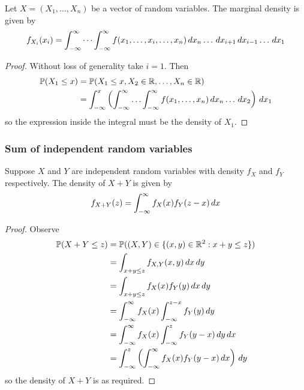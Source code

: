 \documentclass{../../template/note}
\begin{document}
    \begin{proposition}
        Let \(X = (X_1, \dots, X_n)\) be a vector of random variables. The marginal density is given by
        \begin{align*}
            f_{X_i}(x_i) = \int_{-\infty}^\infty \cdots \int_{-\infty}^\infty f(x_1, \dots, x_i, \dots, x_n) \,d{x}_n \dots \,d{x}_{i+1} \,d{x}_{i-1} \dots \,d{x}_1
        \end{align*}
    \end{proposition}

    \begin{proof}
        Without loss of generality take \(i=1\). Then
        \begin{align*}
            \mathbb P(X_1 \leq x) &= \mathbb P(X_1 \leq x, X_2 \in \mathbb R, \dots, X_n \in \mathbb R) \\
            &= \int_{-\infty}^x \left(\int_{-\infty}^\infty \dots \int_{-\infty}^\infty f(x_1, \dots, x_n) \,d{x}_n \dots \,d{x}_2 \right)\,d{x}_1
        \end{align*}
        so the expression inside the integral must be the density of \(X_1\).
    \end{proof}
    
    \subsubsection{Sum of independent random variables}


    \begin{proposition}
        Suppose \(X\) and \(Y\) are independent random variables with density \(f_X\) and \(f_Y\) respectively. The density of \(X+Y\) is given by
        \begin{align*}
            f_{X+Y}(z) = \int_{-\infty}^\infty f_X(x)f_Y(z-x) \,d{x}
        \end{align*}
    \end{proposition}
    
    \begin{proof}
        Observe
        \begin{align*}
            \mathbb P(X+Y \leq z) &= \mathbb P((X, Y) \in \{(x, y) \in \mathbb R^2: x+y \leq z\}) \\
            &= \int_{x+y \leq z} f_{X,Y}(x, y) \,d{x} \,d{y} \\
            &= \int_{x+y \leq z} f_X(x) f_Y(y) \,d{x} \,d{y} \\
            &= \int_{-\infty}^\infty f_X(x) \int_{-\infty}^{z-x} f_Y(y) \,d{y} \\
            &= \int_{-\infty}^\infty f_X(x) \int_{-\infty}^z f_Y(y-x) \,d{y} \,d{x} \\
            &= \int_{-\infty}^z \left(\int_{-\infty}^\infty f_X(x)f_Y(y-x) \,d{x}\right) \,d{y}
        \end{align*}
        so the density of \(X+Y\) is as required.
    \end{proof}
    
\end{document}
